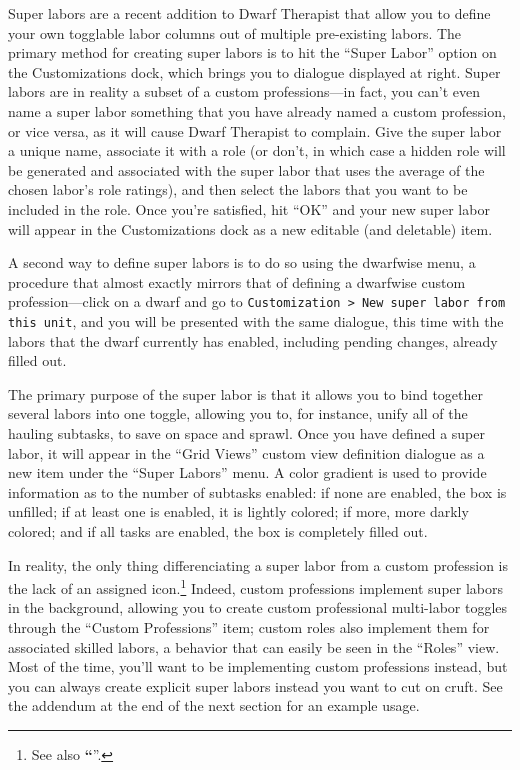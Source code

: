 \documentclass[]{article}
\newcommand{\jump}[1] {\textbf{``\nameref{sec:#1}}''}
\begin{document}
Super labors are a recent addition to Dwarf Therapist that allow you to define your own togglable labor
columns out of multiple pre-existing labors. The primary method for creating super labors is to hit
the ``Super Labor'' option on the Customizations dock, which brings you to dialogue displayed at right.
Super labors are in reality a subset of a custom professions---in fact, you can't even name a super labor
something that you have already named a custom profession, or vice versa, as it will cause Dwarf
Therapist to complain. Give the super labor a unique name, associate it with a role (or don't, in which
case a hidden role will be generated and associated with the super labor that uses the average of the
chosen labor's role ratings), and then select the labors that you want to be included in the role. Once
you're satisfied, hit ``OK'' and your new super labor will appear in the Customizations dock as a new
editable (and deletable) item.

A second way to define super labors is to do so using the dwarfwise menu, a procedure that almost exactly
mirrors that of defining a dwarfwise custom profession---click on a dwarf and go to \texttt{Customization
> New super labor from this unit}, and you will be presented with the same dialogue, this time with the
labors that the dwarf currently has enabled, including pending changes, already filled out.

The primary purpose of the super labor is that it allows you to bind together several labors into one
toggle, allowing you to, for instance, unify all of the hauling subtasks, to save on space and sprawl.
Once you have defined a super labor, it will appear in the ``Grid Views'' custom view definition dialogue
as a new item under the ``Super Labors'' menu. A color gradient is used to provide information as to the
number of subtasks enabled: if none are enabled, the box is unfilled; if at least one is enabled, it is
lightly colored; if more, more darkly colored; and if all tasks are enabled, the box is completely filled
out.

In reality, the only thing differenciating a super labor from a custom profession is the lack of an
assigned icon.\footnote{See also \jump{Custom Icons}.} Indeed, custom professions implement super labors
in the background, allowing you to create custom professional multi-labor toggles through the ``Custom
Professions'' item; custom roles also implement them for associated skilled labors, a behavior that can
easily be seen in the ``Roles'' view. Most of the time, you'll want to be implementing custom professions
instead, but you can always create explicit super labors instead you want to cut on cruft. See the
addendum at the end of the next section for an example usage.
\end{document}
